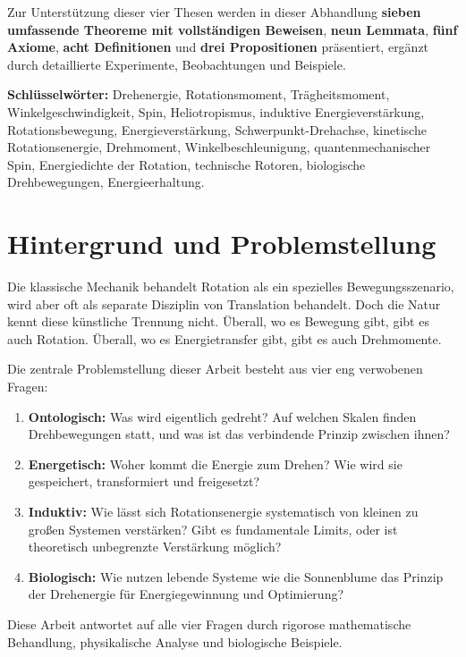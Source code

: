 \documentclass[12pt,a4paper]{report}
\theoremstyle{plain}
\theoremstyle{definition}
\theoremstyle{remark}
\begin{document}
Zur Unterstützung dieser vier Thesen werden in dieser Abhandlung \textbf{sieben umfassende Theoreme mit vollständigen Beweisen}, \textbf{neun Lemmata}, \textbf{fünf Axiome}, \textbf{acht Definitionen} und \textbf{drei Propositionen} präsentiert, ergänzt durch detaillierte Experimente, Beobachtungen und Beispiele.

\textbf{Schlüsselwörter:}
Drehenergie, Rotationsmoment, Trägheitsmoment, Winkelgeschwindigkeit, Spin, Heliotropismus, induktive Energieverstärkung, Rotationsbewegung, Energieverstärkung, Schwerpunkt-Drehachse, kinetische Rotationsenergie, Drehmoment, Winkelbeschleunigung, quantenmechanischer Spin, Energiedichte der Rotation, technische Rotoren, biologische Drehbewegungen, Energieerhaltung.

\section{Hintergrund und Problemstellung}

Die klassische Mechanik behandelt Rotation als ein spezielles Bewegungsszenario, wird aber oft als separate Disziplin von Translation behandelt. Doch die Natur kennt diese künstliche Trennung nicht. Überall, wo es Bewegung gibt, gibt es auch Rotation. Überall, wo es Energietransfer gibt, gibt es auch Drehmomente.

Die zentrale Problemstellung dieser Arbeit besteht aus vier eng verwobenen Fragen:

\begin{enumerate}
	\item \textbf{Ontologisch:} Was wird eigentlich gedreht? Auf welchen Skalen finden Drehbewegungen statt, und was ist das verbindende Prinzip zwischen ihnen?
	
	\item \textbf{Energetisch:} Woher kommt die Energie zum Drehen? Wie wird sie gespeichert, transformiert und freigesetzt?
	
	\item \textbf{Induktiv:} Wie lässt sich Rotationsenergie systematisch von kleinen zu großen Systemen verstärken? Gibt es fundamentale Limits, oder ist theoretisch unbegrenzte Verstärkung möglich?
	
	\item \textbf{Biologisch:} Wie nutzen lebende Systeme wie die Sonnenblume das Prinzip der Drehenergie für Energiegewinnung und Optimierung?
\end{enumerate}

Diese Arbeit antwortet auf alle vier Fragen durch rigorose mathematische Behandlung, physikalische Analyse und biologische Beispiele.
\end{document}
